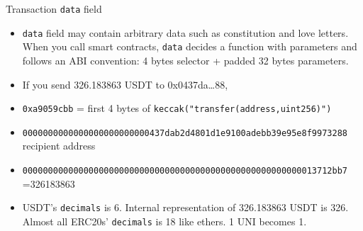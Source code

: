 \begin{frame}[fragile]{Transaction \textnormal{\texttt{data}} field}
  \begin{itemize}
    \item \texttt{data} field may contain arbitrary data such as constitution and love letters. When you call smart contracts, \texttt{data} decides a function with parameters and follows an ABI convention: 4 bytes selector + padded 32 bytes parameters.
    \item If you send 326.183863 USDT to 0x0437da\ldots 88,
    \item \texttt{\scriptsize \colorbox{yellow!10}{0xa9059cbb}} = first 4 bytes of \texttt{\scriptsize keccak("transfer(address,uint256)")}
    \item \texttt{\tiny \colorbox{yellow!10}{0000000000000000000000000437dab2d4801d1e9100adebb39e95e8f9973288}} recipient address
    \item \texttt{\tiny \colorbox{yellow!10}{0000000000000000000000000000000000000000000000000000000013712bb7}} =326183863
    \item USDT's \texttt{decimals} is 6. Internal representation of 326.183863 USDT is 326. Almost all ERC20s' \texttt{decimals} is 18 like ethers. 1 UNI becomes 1.
  \end{itemize}
\end{frame}